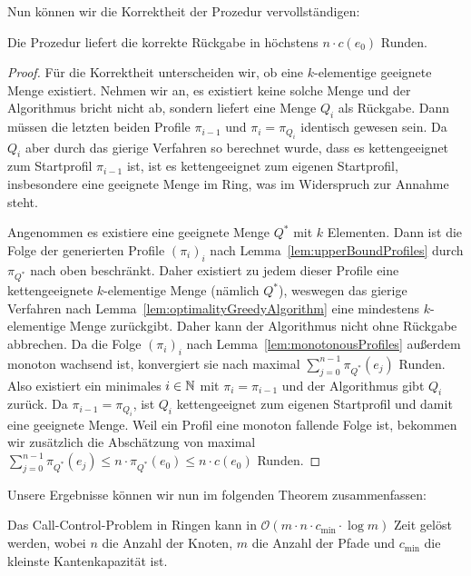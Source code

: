 Nun können wir die Korrektheit der Prozedur vervollständigen:

\begin{lemma}\label{lem:decisionProcedure}
    Die Prozedur liefert die korrekte Rückgabe in höchstens $n\cdot c(e_0)$ Runden.
\end{lemma}
\begin{proof}
    Für die Korrektheit unterscheiden wir, ob eine $k$-elementige geeignete Menge existiert.
    Nehmen wir an, es existiert keine solche Menge und der Algorithmus bricht nicht ab, sondern liefert eine Menge $Q_i$
    als Rückgabe.
    Dann müssen die letzten beiden Profile $\pi_{i-1}$ und $\pi_{i} = \pi_{Q_i}$ identisch gewesen sein.
    Da $Q_i$ aber durch das gierige Verfahren so berechnet wurde, dass es kettengeeignet zum Startprofil
    $\pi_{i-1}$ ist, ist es kettengeeignet zum eigenen Startprofil, insbesondere eine geeignete Menge im Ring, was im
    Widerspruch zur Annahme steht.

    Angenommen es existiere eine geeignete Menge $Q^*$ mit $k$ Elementen.
    Dann ist die Folge der generierten Profile $(\pi_i)_{i}$ nach Lemma~\ref{lem:upperBoundProfiles} durch $\pi_{Q^*}$
    nach oben beschränkt.
    Daher existiert zu jedem dieser Profile eine kettengeeignete $k$-elementige Menge (nämlich $Q^*$),
    weswegen das gierige Verfahren nach Lemma~\ref{lem:optimalityGreedyAlgorithm} eine mindestens $k$-elementige Menge zurückgibt.
    Daher kann der Algorithmus nicht ohne Rückgabe abbrechen.
    Da die Folge $(\pi_i)_i$ nach Lemma~\ref{lem:monotonousProfiles} außerdem monoton wachsend ist, konvergiert sie nach
    maximal $\sum_{j=0}^{n-1}\pi_{Q^*}(e_j)$ Runden.
    Also existiert ein minimales $i\in \mathbb N$ mit $\pi_i = \pi_{i-1}$ und der Algorithmus gibt $Q_i$ zurück.
    Da $\pi_{i-1} = \pi_{Q_{i}}$, ist $Q_i$ kettengeeignet zum eigenen Startprofil und damit eine geeignete Menge.
    Weil ein Profil eine monoton fallende Folge ist, bekommen wir zusätzlich die Abschätzung von maximal
    $\sum_{j=0}^{n-1}\pi_{Q^*}(e_j) \leq n \cdot \pi_{Q^*}(e_0) \leq n \cdot c(e_0)$ Runden.
\end{proof}
Unsere Ergebnisse können wir nun im folgenden Theorem zusammenfassen:
\begin{theorem}
    Das Call-Control-Problem in Ringen kann in $\mathcal O(m \cdot n \cdot c_{\min} \cdot \log m)$ Zeit gelöst werden,
    wobei $n$ die Anzahl der Knoten, $m$ die Anzahl der Pfade und $c_{\min}$ die kleinste Kantenkapazität ist.
\end{theorem}
